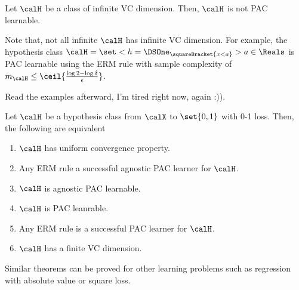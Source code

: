 \begin{theorem}
    Let \(\calH\) be a class of infinite VC dimension. Then, \(\calH\) is not PAC learnable. 
\end{theorem}

Note that, not all infinite \(\calH\) has infinite VC dimension. For example, the hypothesis class \(\calH = \set<h = \DSOne_{\squareBracket{x < a}}>{a \in \Reals}\) is PAC learnable using the ERM rule with sample complexity of \(m_{\calH} \leq \ceil{\frac{\log 2 - \log \delta}{\epsilon}}\). 

Read the examples afterward, I'm tired right now, again :)).

\begin{theorem}
    Let \(\calH\) be a hypothesis class from \(\calX\) to \(\set{0,1}\) with 0-1 loss. Then, the following are equivalent
    \begin{enumerate}
        \item \(\calH\) has uniform convergence property.
        \item Any ERM rule a successful agnostic PAC learner for \(\calH\).
        \item \(\calH\) is agnostic PAC learnable.
        \item \(\calH\) is PAC leanrable.
        \item Any ERM rule is a successful PAC learner for \(\calH\).
        \item \(\calH\) has a finite VC dimension.
    \end{enumerate}
\end{theorem}
Similar theorems can be proved for other learning problems such as regression with absolute value or square loss. 


